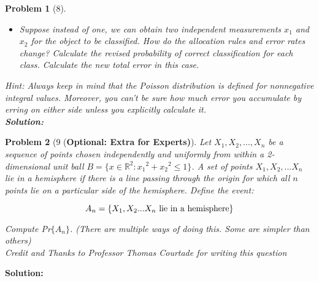 \documentclass[11pt]{article}
\theoremstyle{quest}
\newtheorem*{question}{Problem}
\begin{document}
\begin{question}[8]
\begin{itemize}
\begin{align*}
x(\ln{\frac{\lambda_2}{\lambda_1}}-\ln{\frac{\lambda_1}{\lambda_2}}) &= 2(\lambda_2-\lambda_1)\\
2x\cdot\ln{\frac{\lambda_2}{\lambda_1}}&= 2(\lambda_2-\lambda_1)\\
x &= \frac{\lambda_2-\lambda_1}{\ln{\frac{\lambda_2}{\lambda_1}}}\\
&= 12.33
\end{align*}
Classification and error rates are: \begin{align*}
P(f(x)=\omega_1|y=\omega_1)P(y=\omega_1) &= \frac12\sum_{x=0}^{12} e^{-10}\frac{10^x}{x!}\\
&= 0.396\qquad\text{(Wolfram Alpha)}\\
P(f(x)=\omega_2|y=\omega_2)P(y=\omega_2) &= \frac12\sum_{x=13}^{\infty} e^{-15}\frac{15^x}{x!}\\
&= \frac12(1-\sum_{x=0}^{12} e^{-15}\frac{15^x}{x!})\\
&= 0.366\qquad\text{(Wolfram Alpha)}\\
P(\text{correct}) &= 0.396+0.366=0.762\\
P(\text{error}) &= 1-0.762 = 0.238
\end{align*}
\vspace{0.5in}
\item[(c)] Suppose instead of one, we can obtain two independent measurements $x_1$ and $x_2$ for the object to be classified. How do the allocation rules and error rates change? Calculate the revised probability of correct classification for each class. Calculate the new total error in this case. 
\end{itemize}

\textit{Hint:} Always keep in mind that the Poisson distribution is defined for nonnegative integral values. Moreover, you can't be sure how much error you accumulate by erring on either side unless you explicitly calculate it.\\
\textbf{Solution:}

\end{question}
\newpage

\begin{question}[9 (\textbf{Optional: Extra for Experts)}
]

\vspace{5mm}

Let $X_1,X_2,...,X_n$ be a sequence of points chosen independently and uniformly from within a 2-dimensional unit ball $B = \{x\in \mathbb{R}^2 : {x_1}^2 + {x_2}^2 \leq 1\}$. A set of points $X_1,X_2,...X_n$ lie in a hemisphere if there is a line passing through the origin for which all $n$ points lie on a particular side of the hemisphere. Define the event:

$$A_n = \{X_1,X_2...X_n \textnormal{ lie in a hemisphere}\}$$

\noindent Compute Pr$\{A_n\}$. (There are multiple ways of doing this. Some are simpler than others)\\

\noindent Credit and Thanks to Professor Thomas Courtade for writing this question
\end{question}
\vspace{12pt}
\textbf{Solution:}
\end{document}

